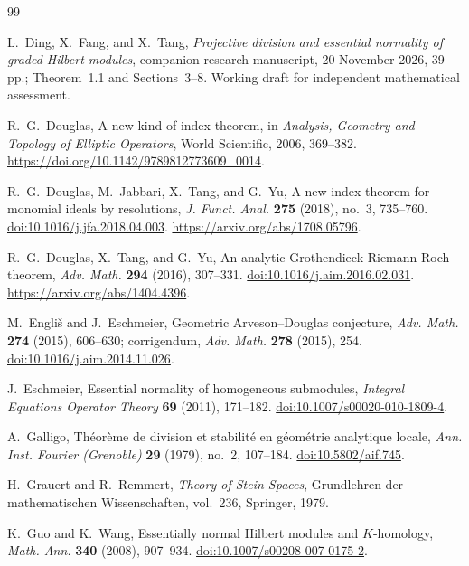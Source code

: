 \documentclass[11pt,reqno]{amsart}
\theoremstyle{remark}
\begin{document}
\begin{thebibliography}{99}

L.~Ding, X.~Fang, and X.~Tang,
\emph{Projective division and essential normality of graded Hilbert modules},
companion research manuscript, 20 November 2026, 39 pp.;
Theorem~1.1 and Sections~3--8. Working draft for independent
mathematical assessment.


R.~G.~Douglas, A new kind of index theorem, in
\emph{Analysis, Geometry and Topology of Elliptic Operators},
World Scientific, 2006, 369--382.
\url{https://doi.org/10.1142/9789812773609_0014}.

R.~G.~Douglas, M.~Jabbari, X.~Tang, and G.~Yu,
A new index theorem for monomial ideals by resolutions,
\emph{J. Funct. Anal.} \textbf{275} (2018), no.~3, 735--760. \href{https://doi.org/10.1016/j.jfa.2018.04.003}{doi:10.1016/j.jfa.2018.04.003}.
\url{https://arxiv.org/abs/1708.05796}.

R.~G.~Douglas, X.~Tang, and G.~Yu, An analytic Grothendieck Riemann
Roch theorem, \emph{Adv. Math.} \textbf{294} (2016), 307--331.
\href{https://doi.org/10.1016/j.aim.2016.02.031}{doi:10.1016/j.aim.2016.02.031}.
\url{https://arxiv.org/abs/1404.4396}.

M.~Engli\v{s} and J.~Eschmeier, Geometric Arveson--Douglas conjecture,
\emph{Adv. Math.} \textbf{274} (2015), 606--630; corrigendum,
\emph{Adv. Math.} \textbf{278} (2015), 254.
\href{https://doi.org/10.1016/j.aim.2014.11.026}{doi:10.1016/j.aim.2014.11.026}.


J.~Eschmeier, Essential normality of homogeneous submodules,
\emph{Integral Equations Operator Theory} \textbf{69} (2011), 171--182.
\href{https://doi.org/10.1007/s00020-010-1809-4}{doi:10.1007/s00020-010-1809-4}.

A.~Galligo, Th\'eor\`eme de division et stabilit\'e en g\'eom\'etrie
analytique locale, \emph{Ann. Inst. Fourier (Grenoble)}
\textbf{29} (1979), no.~2, 107--184.
\href{https://doi.org/10.5802/aif.745}{doi:10.5802/aif.745}.

H.~Grauert and R.~Remmert, \emph{Theory of Stein Spaces},
Grundlehren der mathematischen Wissenschaften, vol.~236,
Springer, 1979.

K.~Guo and K.~Wang, Essentially normal Hilbert modules and
$K$-homology, \emph{Math. Ann.} \textbf{340} (2008), 907--934.
\href{https://doi.org/10.1007/s00208-007-0175-2}{doi:10.1007/s00208-007-0175-2}.



\end{thebibliography}
\end{document}

